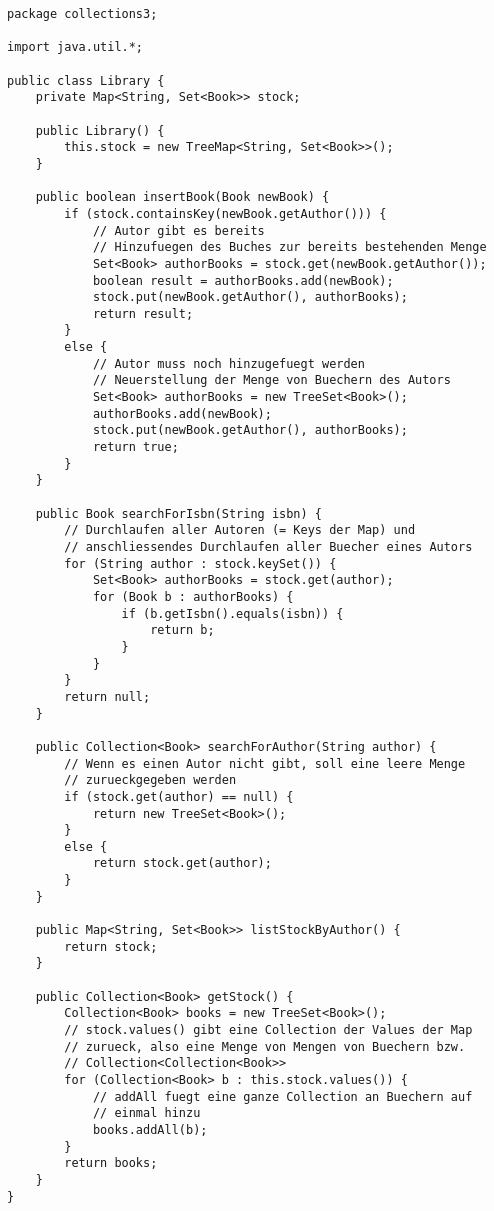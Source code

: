 \documentclass{article}
\begin{document}
	\begin{lstlisting}[style=java,tabsize=2]
package collections3;

import java.util.*;

public class Library {
	private Map<String, Set<Book>> stock;

	public Library() {
		this.stock = new TreeMap<String, Set<Book>>();
	}

	public boolean insertBook(Book newBook) {
		if (stock.containsKey(newBook.getAuthor())) {
			// Autor gibt es bereits
			// Hinzufuegen des Buches zur bereits bestehenden Menge
			Set<Book> authorBooks = stock.get(newBook.getAuthor());
			boolean result = authorBooks.add(newBook);
			stock.put(newBook.getAuthor(), authorBooks);
			return result;
		}
		else {
			// Autor muss noch hinzugefuegt werden
			// Neuerstellung der Menge von Buechern des Autors
			Set<Book> authorBooks = new TreeSet<Book>();
			authorBooks.add(newBook);
			stock.put(newBook.getAuthor(), authorBooks);
			return true;
		}
	}

	public Book searchForIsbn(String isbn) {
		// Durchlaufen aller Autoren (= Keys der Map) und
		// anschliessendes Durchlaufen aller Buecher eines Autors
		for (String author : stock.keySet()) {
			Set<Book> authorBooks = stock.get(author);
			for (Book b : authorBooks) {
				if (b.getIsbn().equals(isbn)) {
					return b;
				}
			}
		}
		return null;
	}

	public Collection<Book> searchForAuthor(String author) {
		// Wenn es einen Autor nicht gibt, soll eine leere Menge 
		// zurueckgegeben werden
		if (stock.get(author) == null) {
			return new TreeSet<Book>();
		} 
		else {
			return stock.get(author);
		}
	}

	public Map<String, Set<Book>> listStockByAuthor() {
		return stock;
	}

	public Collection<Book> getStock() {
		Collection<Book> books = new TreeSet<Book>();
		// stock.values() gibt eine Collection der Values der Map 
		// zurueck, also eine Menge von Mengen von Buechern bzw.
		// Collection<Collection<Book>>
		for (Collection<Book> b : this.stock.values()) {
			// addAll fuegt eine ganze Collection an Buechern auf
			// einmal hinzu
			books.addAll(b);
		}
		return books;
	}
}
	\end{lstlisting}
	
\end{document}

